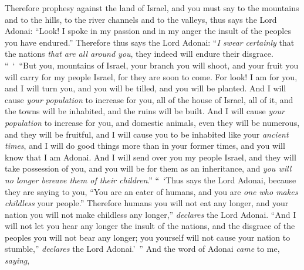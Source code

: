 \begin{biblechapter}
\verse Therefore prophesy against the land of Israel, and you must say to the mountains and to the hills, to the river channels and to the valleys, thus says the Lord Adonai: “Look! I spoke in my passion and in my anger the insult of the peoples you have endured.”
\verse Therefore thus says the Lord Adonai: “\textit{I swear} \textit{certainly} that the nations \textit{that are all around you}, they indeed will endure their disgrace.
\verse “ ‘ “But you, mountains of Israel, your branch you will shoot, and your fruit you will carry for my people Israel, for they are soon to come.
\verse For look! I am for you, and I will turn you, and you will be tilled, and you will be planted.
\verse And I will cause \textit{your population} to increase for you, all of the house of Israel, all of it, and the towns will be inhabited, and the ruins will be built.
\verse And I will cause \textit{your population} to increase for you, and domestic animals, even they will be numerous, and they will be fruitful, and I will cause you to be inhabited like your \textit{ancient times}, and I will do good things more than in your former times, and you will know that I am Adonai.
\verse And I will send over you my people Israel, and they will take possession of you, and you will be for them as an inheritance, and \textit{you will no longer bereave them of their children}.”
\verse “ ‘Thus says the Lord Adonai, because they are saying to you, “You are an eater of humans, and you are \textit{one who makes childless} your people.”
\verse Therefore humans you will not eat any longer, and your nation you will not make childless any longer,” \textit{declares} the Lord Adonai.
\verse “And I will not let you hear any longer the insult of the nations, and the disgrace of the peoples you will not bear any longer; you yourself will not cause your nation to stumble,” \textit{declares} the Lord Adonai.’ ”
\verse And the word of Adonai \textit{came} to me, \textit{saying},

\end{biblechapter}
